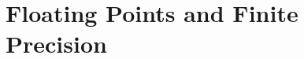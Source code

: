 \newcommand{\precisionpath}{\thischapterpath}

\chapter{Floating Points and Finite Precision}
\label{ch:floatingpoint}
